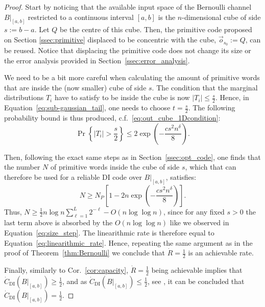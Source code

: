 \documentclass[10pt, conference]{IEEEtran}
\newcommand{\1}{\mathds{1}}
\begin{document}
\begin{proof}
Start by noticing that the available input space of the Bernoulli channel $B|_{[a,b]}$ restricted to a continuous interval $[a,b]$ is the $n$-dimensional cube of side $s:=b-a$. Let $Q$ be the centre of this cube. Then, the primitive code proposed on Section \ref{ssec:primitive} displaced to be concentric with the cube, $\vec o_{s_0}:=Q$, can be reused. Notice that displacing the primitive code does not change its size or the error analysis provided in Section~\ref{ssec:error_analysis}.

We need to be a bit more careful when calculating the amount of primitive words that are inside the (now smaller) cube of side $s$. The condition that the marginal distributions $T_i$ have to satisfy to be inside the cube is now $|T_i|\leq\frac{s}{2}$. Hence, in Equation~\eqref{eq:sub-gaussian_tail}, one needs to choose $t=\frac s2$. The following probability bound is thus produced, c.f.~\eqref{eq:out_cube_1Dcondition}:
\begin{equation}
\Pr\left\{|T_i|> \frac s2\right\}\leq 2\exp\left(-\frac{cs^2n^\delta}{8}\right).
\end{equation}

Then, following the exact same steps as in Section~\ref{ssec:opt_code}, one finds that the number $N$ of primitive words inside the cube of side $s$, which that can therefore be used for a reliable DI code over $B|_{[a,b]}$, satisfies:
\begin{equation}
N\geq N_P\left[1-2n\exp\left(-\frac{cs^2n^\delta}{8}\right)\right].
\end{equation}
Thus, $N\geq\frac12 n\log n\sum_{\ell=1}^L 2^{-\ell}-O(n\log\log n)$, since for any fixed $s>0$ the last term above is absorbed by the $O(n\log\log n)$ like we observed in Equation~\eqref{eq:size_step}. The linearithmic rate is therefore equal to Equation~\eqref{eq:linearithmic_rate}. Hence, repeating the same argument as in the proof of Theorem~\ref{thm:Bernoulli} we conclude that $\dot R=\frac12$ is an achievable rate. 

Finally, similarly to Cor.~\ref{cor:capacity}, $\dot R=\frac12$ being achievable implies that $\dot C_\text{{DI}}(B|_{[a,b]})\geq\frac12$, and as $\dot C_\text{{DI}}(B|_{[a,b]})\leq\frac12$, see \cite{CDBW:DI_classical}, it can be concluded that $\dot C_\text{{DI}}(B|_{[a,b]})=\frac12$.
\end{proof}
\end{document}
